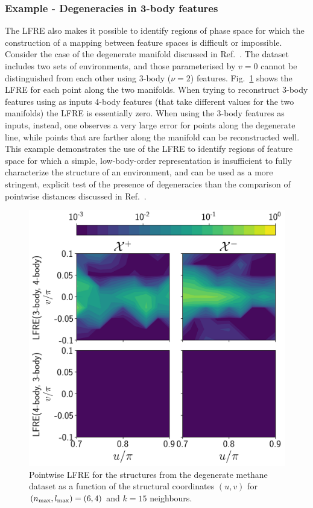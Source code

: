 \subsubsection{Example - Degeneracies in 3-body features}
The LFRE also makes it possible to identify regions of phase space for which the construction of a mapping between feature spaces is difficult or impossible. 
Consider the case of the degenerate manifold discussed in Ref.~. The dataset includes two sets of  environments, and those parameterised by $v=0$ cannot be distinguished from each other using 3-body ($\nu=2$) features.
Fig.~\ref{fig:soap_degenerated_manifold_lfre} shows the LFRE for each point along the two manifolds. When trying to reconstruct 3-body features using as inputs 4-body features (that take different values for the two manifolds) the LFRE is essentially zero. When using the 3-body features as inputs, instead, one observes a very large error for points along the degenerate line, while points that are farther along the manifold can be reconstructed well. This example demonstrates the use of the LFRE to identify regions of feature space for which a simple, low-body-order representation is insufficient to fully characterize the structure of an environment, and can be used as a more stringent, explicit test of the presence of degeneracies than the comparison of pointwise distances discussed in Ref.~. 

\begin{figure}
    \centering
    \includegraphics[scale=0.42]{fig/lfre-body_order_comparison-nb_local_neighbours=15-degenerated_manifold.png}
\caption{Pointwise LFRE for the structures from the degenerate methane dataset as a function of the structural coordinates $(u,v)$ for $(n_\mathrm{max},l_\mathrm{max}) = (6,4)$ and $k=15$ neighbours.}
    \label{fig:soap_degenerated_manifold_lfre}
\end{figure}

